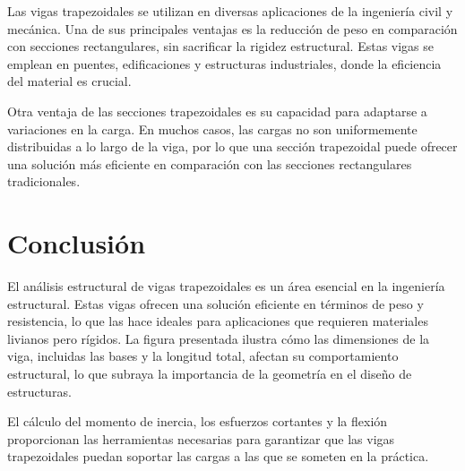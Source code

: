 Las vigas trapezoidales se utilizan en diversas aplicaciones de la ingeniería civil y mecánica. Una de sus principales ventajas es la reducción de peso en comparación con secciones rectangulares, sin sacrificar la rigidez estructural. Estas vigas se emplean en puentes, edificaciones y estructuras industriales, donde la eficiencia del material es crucial.

Otra ventaja de las secciones trapezoidales es su capacidad para adaptarse a variaciones en la carga. En muchos casos, las cargas no son uniformemente distribuidas a lo largo de la viga, por lo que una sección trapezoidal puede ofrecer una solución más eficiente en comparación con las secciones rectangulares tradicionales.

\section{Conclusión}

El análisis estructural de vigas trapezoidales es un área esencial en la ingeniería estructural. Estas vigas ofrecen una solución eficiente en términos de peso y resistencia, lo que las hace ideales para aplicaciones que requieren materiales livianos pero rígidos. La figura presentada ilustra cómo las dimensiones de la viga, incluidas las bases y la longitud total, afectan su comportamiento estructural, lo que subraya la importancia de la geometría en el diseño de estructuras.

El cálculo del momento de inercia, los esfuerzos cortantes y la flexión proporcionan las herramientas necesarias para garantizar que las vigas trapezoidales puedan soportar las cargas a las que se someten en la práctica.

